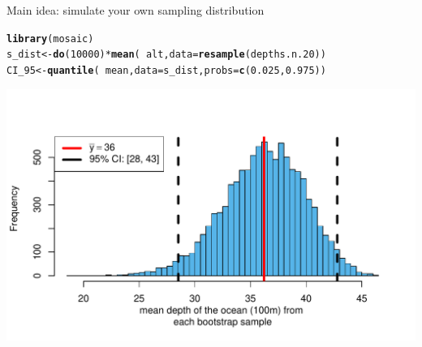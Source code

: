 \documentclass{beamer}\usepackage[]{graphicx}\usepackage[]{color}
\newcommand{\hlnum}[1]{\textcolor[rgb]{0.686,0.059,0.569}{#1}}%
\newcommand{\hlopt}[1]{\textcolor[rgb]{0,0,0}{#1}}%
\newcommand{\hlstd}[1]{\textcolor[rgb]{0.345,0.345,0.345}{#1}}%
\newcommand{\hlkwb}[1]{\textcolor[rgb]{0.69,0.353,0.396}{#1}}%
\newcommand{\hlkwc}[1]{\textcolor[rgb]{0.333,0.667,0.333}{#1}}%
\newcommand{\hlkwd}[1]{\textcolor[rgb]{0.737,0.353,0.396}{\textbf{#1}}}%
\newenvironment{knitrout}{}{} %
\begin{document}
\begin{frame}[fragile]{Main idea: simulate your own sampling distribution}



\begin{knitrout}\scriptsize
{}\color{fgcolor}
\begin{alltt}
\hlkwd{library}\hlstd{(mosaic)}
\hlstd{s_dist} \hlkwb{<-} \hlkwd{do}\hlstd{(}\hlnum{10000}\hlstd{)} \hlopt{*} \hlkwd{mean}\hlstd{(} \hlopt{~} \hlstd{alt,} \hlkwc{data} \hlstd{=} \hlkwd{resample}\hlstd{(depths.n.20))}
\hlstd{CI_95} \hlkwb{<-} \hlkwd{quantile}\hlstd{(}\hlopt{~} \hlstd{mean,} \hlkwc{data} \hlstd{= s_dist,} \hlkwc{probs} \hlstd{=} \hlkwd{c}\hlstd{(}\hlnum{0.025}\hlstd{,} \hlnum{0.975}\hlstd{))}
\end{alltt}


{\centering \includegraphics[width=1\linewidth]{figure/unnamed-chunk-7-1} 

}



\end{knitrout}

\end{frame}
\end{document}
